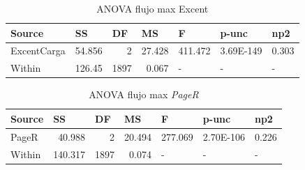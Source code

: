 \documentclass{article}
\begin{document}
\begin{table}[htbp]
  \centering
  \caption{ANOVA flujo max Excent}
    \begin{tabular}{lrrrlll}
    \textbf{Source} & \multicolumn{1}{l}{\textbf{SS}} & \multicolumn{1}{l}{\textbf{DF}} & \multicolumn{1}{l}{\textbf{MS}} & \textbf{F} & \textbf{p-unc} & \textbf{np2} \\
    \midrule
    ExcentCarga & 54.856 & 2     & 27.428 & \multicolumn{1}{r}{411.472} & \multicolumn{1}{r}{3.69E-149} & \multicolumn{1}{r}{0.303} \\
    Within & 126.45 & 1897  & 0.067 & -     & -     & - \\
    \bottomrule
    \end{tabular}%
  \label{tab:addlabel}%
\end{table}%

\begin{table}[htbp]
  \centering
  \caption{ANOVA flujo max \textit{PageR}}
    \begin{tabular}{lrrrlll}
    \textbf{Source} & \multicolumn{1}{l}{\textbf{SS}} & \multicolumn{1}{l}{\textbf{DF}} & \multicolumn{1}{l}{\textbf{MS}} & \textbf{F} & \textbf{p-unc} & \textbf{np2} \\
    \midrule
    PageR & 40.988 & 2     & 20.494 & \multicolumn{1}{r}{277.069} & \multicolumn{1}{r}{2.70E-106} & \multicolumn{1}{r}{0.226} \\
    Within & 140.317 & 1897  & 0.074 & -     & -     & - \\
    \bottomrule
    \end{tabular}%
  \label{tab:addlabel}%
\end{table}%
\end{document}
